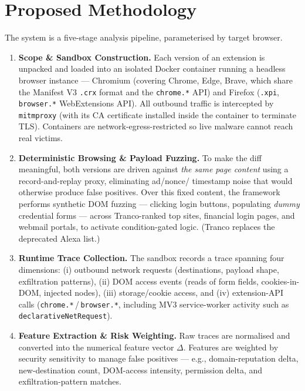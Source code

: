 \documentclass[11pt]{article}
\newcommand{\dem}[1]{\textbf{#1}}
\begin{document}
\section{Proposed Methodology}
The system is a five-stage analysis pipeline, parameterised by target browser.

\begin{enumerate}[leftmargin=1.4em,itemsep=0.3em]
\item \dem{Scope \& Sandbox Construction.} Each version of an extension is unpacked and loaded into
an isolated Docker container running a headless browser instance --- Chromium (covering Chrome, Edge,
Brave, which share the Manifest V3 \texttt{.crx} format and the \texttt{chrome.*} API) and Firefox
(\texttt{.xpi}, \texttt{browser.*} WebExtensions API). All outbound traffic is intercepted by
\texttt{mitmproxy} (with its CA certificate installed inside the container to terminate TLS).
Containers are network-egress-restricted so live malware cannot reach real victims.

\item \dem{Deterministic Browsing \& Payload Fuzzing.} To make the diff meaningful, both versions are
driven against \emph{the same page content} using a record-and-replay proxy, eliminating ad/nonce/
timestamp noise that would otherwise produce false positives. Over this fixed content, the framework
performs synthetic DOM fuzzing --- clicking login buttons, populating \emph{dummy} credential forms ---
across Tranco-ranked top sites, financial login pages, and webmail portals, to activate
condition-gated logic. (Tranco replaces the deprecated Alexa list.)

\item \dem{Runtime Trace Collection.} The sandbox records a trace spanning four dimensions:
(i) outbound network requests (destinations, payload shape, exfiltration patterns),
(ii) DOM access events (reads of form fields, cookies-in-DOM, injected nodes),
(iii) storage/cookie access, and (iv) extension-API calls (\texttt{chrome.*}\,/\,\texttt{browser.*},
including MV3 service-worker activity such as \texttt{declarativeNetRequest}).

\item \dem{Feature Extraction \& Risk Weighting.} Raw traces are normalised and converted into the
numerical feature vector $\Delta$. Features are weighted by security sensitivity to manage false
positives --- e.g., domain-reputation delta, new-destination count, DOM-access intensity, permission
delta, and exfiltration-pattern matches.


\end{enumerate}
\end{document}
